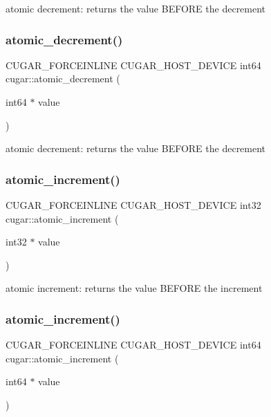 atomic decrement\+: returns the value B\+E\+F\+O\+RE the decrement \mbox{\label{group___atomics_gae94ecfb92e8d261326f527daa39c770d}} 
\subsubsection{\texorpdfstring{atomic\+\_\+decrement()}{atomic\_decrement()}\hspace{0.1cm}{\footnotesize\ttfamily [2/2]}}
{\footnotesize\ttfamily C\+U\+G\+A\+R\+\_\+\+F\+O\+R\+C\+E\+I\+N\+L\+I\+NE C\+U\+G\+A\+R\+\_\+\+H\+O\+S\+T\+\_\+\+D\+E\+V\+I\+CE int64 cugar\+::atomic\+\_\+decrement (\begin{DoxyParamCaption}\item[{int64 $\ast$}]{value }\end{DoxyParamCaption})}

atomic decrement\+: returns the value B\+E\+F\+O\+RE the decrement \mbox{\label{group___atomics_ga3034bbde9594dc3c4894fe31ad5a0b3c}} 
\subsubsection{\texorpdfstring{atomic\+\_\+increment()}{atomic\_increment()}\hspace{0.1cm}{\footnotesize\ttfamily [1/2]}}
{\footnotesize\ttfamily C\+U\+G\+A\+R\+\_\+\+F\+O\+R\+C\+E\+I\+N\+L\+I\+NE C\+U\+G\+A\+R\+\_\+\+H\+O\+S\+T\+\_\+\+D\+E\+V\+I\+CE int32 cugar\+::atomic\+\_\+increment (\begin{DoxyParamCaption}\item[{int32 $\ast$}]{value }\end{DoxyParamCaption})}

atomic increment\+: returns the value B\+E\+F\+O\+RE the increment \mbox{\label{group___atomics_ga57595e5240e01e562a47816a82e14dd2}} 
\subsubsection{\texorpdfstring{atomic\+\_\+increment()}{atomic\_increment()}\hspace{0.1cm}{\footnotesize\ttfamily [2/2]}}
{\footnotesize\ttfamily C\+U\+G\+A\+R\+\_\+\+F\+O\+R\+C\+E\+I\+N\+L\+I\+NE C\+U\+G\+A\+R\+\_\+\+H\+O\+S\+T\+\_\+\+D\+E\+V\+I\+CE int64 cugar\+::atomic\+\_\+increment (\begin{DoxyParamCaption}\item[{int64 $\ast$}]{value }\end{DoxyParamCaption})}

